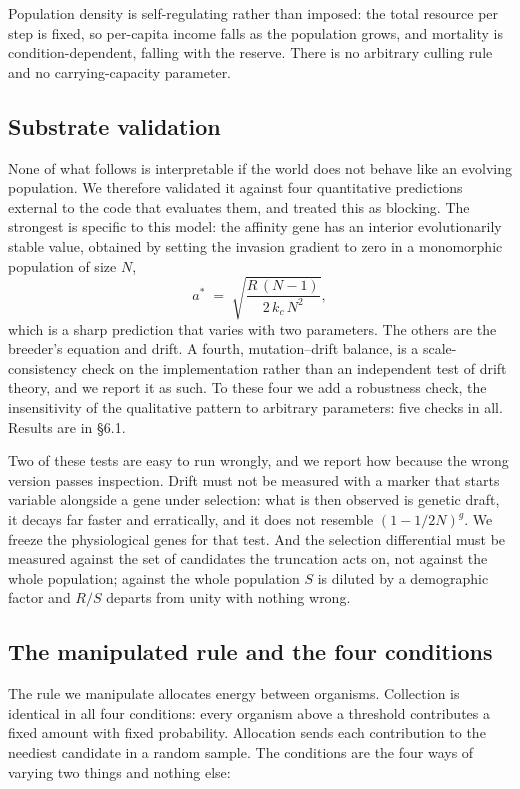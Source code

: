 Population density is self-regulating rather than imposed: the total resource
per step is fixed, so per-capita income falls as the population grows, and
mortality is condition-dependent, falling with the reserve. There is no
arbitrary culling rule and no carrying-capacity parameter.

\subsection{Substrate validation}

None of what follows is interpretable if the world does not behave like an
evolving population. We therefore validated it against four quantitative
predictions external to the code that evaluates them, and treated this as
blocking. The strongest is specific to this model: the affinity gene has an
interior evolutionarily stable value, obtained by setting the invasion gradient
to zero in a monomorphic population of size $N$,
\begin{equation}
a^{*} \;=\; \sqrt{\frac{R\,(N-1)}{2\,k_c\,N^{2}}} ,
\label{eq:ess}
\end{equation}
which is a sharp prediction that varies with two parameters. The others are the
breeder's equation and drift. A fourth, mutation--drift balance, is a
scale-consistency check on the implementation rather than an independent test
of drift theory, and we report it as such. To these four we add a robustness
check, the insensitivity of the qualitative pattern to arbitrary parameters:
five checks in all. Results are in \S6.1.

Two of these tests are easy to run wrongly, and we report how because the wrong
version passes inspection. Drift must not be measured with a marker that starts
variable alongside a gene under selection: what is then observed is genetic
draft, it decays far faster and erratically, and it does not resemble
$(1-1/2N)^g$. We freeze the physiological genes for that test. And the selection
differential must be measured against the set of candidates the truncation acts
on, not against the whole population; against the whole population $S$ is
diluted by a demographic factor and $R/S$ departs from unity with nothing
wrong.

\subsection{The manipulated rule and the four conditions}

The rule we manipulate allocates energy between organisms. Collection is
identical in all four conditions: every organism above a threshold contributes
a fixed amount with fixed probability. Allocation sends each contribution to
the neediest candidate in a random sample. The conditions are the four ways of
varying two things and nothing else:

